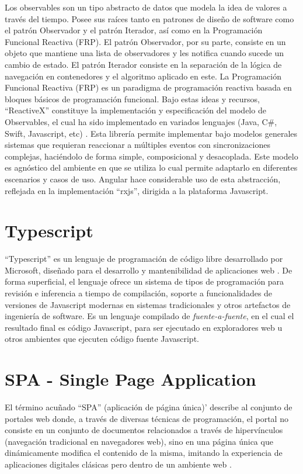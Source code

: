 Los observables son un tipo abstracto de datos que modela la idea de valores a través del tiempo. Posee sus raíces tanto en patrones de diseño de software como el patrón Observador y el patrón Iterador, así como en la Programación Funcional Reactiva (FRP). El patrón Observador, por su parte, consiste en un objeto que mantiene una lista de observadores y les notifica cuando sucede un cambio de estado. El patrón Iterador consiste en la separación de la lógica de navegación en contenedores y el algoritmo aplicado en este. La Programación Funcional Reactiva (FRP) es un paradigma de programación reactiva basada en bloques básicos de programación funcional. Bajo estas ideas y recursos, ``ReactiveX'' constituye la implementación y especificación del modelo de Observables, el cual ha sido implementado en variados lenguajes (Java, C\#, Swift, Javascript, etc) \cite{reactivex}. Esta librería permite implementar bajo modelos generales sistemas que requieran reaccionar a múltiples eventos con sincronizaciones complejas, haciéndolo de forma simple, composicional y desacoplada. Este modelo es agnóstico del ambiente en que se utiliza lo cual permite adaptarlo en diferentes escenarios y casos de uso. Angular hace considerable uso de esta abstracción, reflejada en la implementación ``rxjs'', dirigida a la plataforma Javascript.

\section{Typescript}

``Typescript'' es un lenguaje de programación de código libre desarrollado por Microsoft, diseñado para el desarrollo y mantenibilidad de aplicaciones web \cite{typescript}. De forma superficial, el lenguaje ofrece un sistema de tipos de programación para revisión e inferencia a tiempo de compilación, soporte a funcionalidades de versiones de Javascript modernas en sistemas tradicionales y otros artefactos de ingeniería de software. Es un lenguaje compilado de \textit{fuente-a-fuente}, en el cual el resultado final es código Javascript, para ser ejecutado en exploradores web u otros ambientes que ejecuten código fuente Javascript.

\section{SPA - Single Page Application}

El término acuñado ``SPA'' (aplicación de página única)' describe al conjunto de portales web donde, a través de diversas técnicas de programación, el portal no consiste en un conjunto de documentos relacionados a través de hipervínculos (navegación tradicional en navegadores web), sino en una página única que dinámicamente modifica el contenido de la misma, imitando la experiencia de aplicaciones digitales clásicas pero dentro de un ambiente web \cite{spa}.

